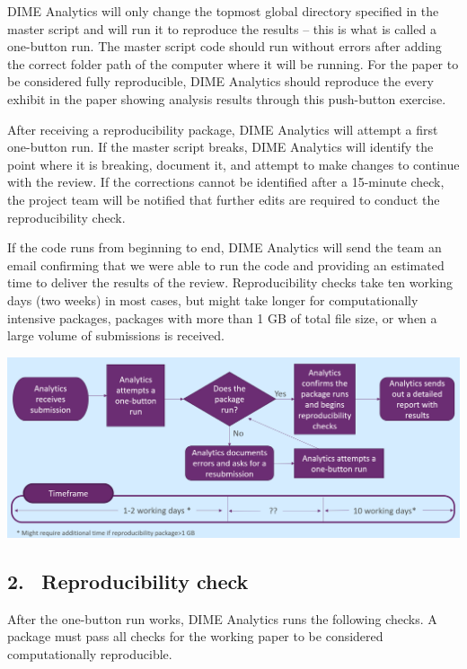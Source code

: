 \begin{fullwidth}
	DIME Analytics will only change the topmost global directory specified in the master script and will run it to reproduce the results – this is what is called a one-button run. The master script code should run without errors after adding the correct folder path of the computer where it will be running. For the paper to be considered fully reproducible, DIME Analytics should reproduce the every exhibit in the paper showing analysis results through this push-button exercise.

	\bigskip

	After receiving a reproducibility package, DIME Analytics will attempt a first one-button run. If the master script breaks, DIME Analytics will identify the point where it is breaking, document it, and attempt to make changes to continue with the review. If the corrections cannot be identified after a 15-minute check, the project team will be notified that further edits are required to conduct the reproducibility check.

	\bigskip

	If the code runs from beginning to end, DIME Analytics will send the team an email confirming that we were able to run the code and providing an estimated time to deliver the results of the review. Reproducibility checks take ten working days (two weeks) in most cases, but might take longer for computationally intensive packages, packages with more than 1 GB of total file size, or when a large volume of submissions is received.

	\bigskip
	
	\begin{center}
		\includegraphics[width=0.9\linewidth]{../img/rep-checks-timeline.png}
	\end{center}

	\subsection{2. \, Reproducibility check}

	After the one-button run works, DIME Analytics runs the following checks. A package must pass all checks for the working paper to be considered computationally reproducible. 


\end{fullwidth}
